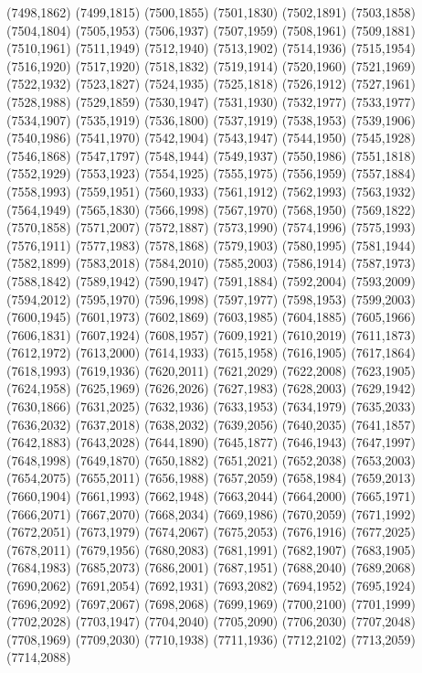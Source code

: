(7498,1862)
(7499,1815)
(7500,1855)
(7501,1830)
(7502,1891)
(7503,1858)
(7504,1804)
(7505,1953)
(7506,1937)
(7507,1959)
(7508,1961)
(7509,1881)
(7510,1961)
(7511,1949)
(7512,1940)
(7513,1902)
(7514,1936)
(7515,1954)
(7516,1920)
(7517,1920)
(7518,1832)
(7519,1914)
(7520,1960)
(7521,1969)
(7522,1932)
(7523,1827)
(7524,1935)
(7525,1818)
(7526,1912)
(7527,1961)
(7528,1988)
(7529,1859)
(7530,1947)
(7531,1930)
(7532,1977)
(7533,1977)
(7534,1907)
(7535,1919)
(7536,1800)
(7537,1919)
(7538,1953)
(7539,1906)
(7540,1986)
(7541,1970)
(7542,1904)
(7543,1947)
(7544,1950)
(7545,1928)
(7546,1868)
(7547,1797)
(7548,1944)
(7549,1937)
(7550,1986)
(7551,1818)
(7552,1929)
(7553,1923)
(7554,1925)
(7555,1975)
(7556,1959)
(7557,1884)
(7558,1993)
(7559,1951)
(7560,1933)
(7561,1912)
(7562,1993)
(7563,1932)
(7564,1949)
(7565,1830)
(7566,1998)
(7567,1970)
(7568,1950)
(7569,1822)
(7570,1858)
(7571,2007)
(7572,1887)
(7573,1990)
(7574,1996)
(7575,1993)
(7576,1911)
(7577,1983)
(7578,1868)
(7579,1903)
(7580,1995)
(7581,1944)
(7582,1899)
(7583,2018)
(7584,2010)
(7585,2003)
(7586,1914)
(7587,1973)
(7588,1842)
(7589,1942)
(7590,1947)
(7591,1884)
(7592,2004)
(7593,2009)
(7594,2012)
(7595,1970)
(7596,1998)
(7597,1977)
(7598,1953)
(7599,2003)
(7600,1945)
(7601,1973)
(7602,1869)
(7603,1985)
(7604,1885)
(7605,1966)
(7606,1831)
(7607,1924)
(7608,1957)
(7609,1921)
(7610,2019)
(7611,1873)
(7612,1972)
(7613,2000)
(7614,1933)
(7615,1958)
(7616,1905)
(7617,1864)
(7618,1993)
(7619,1936)
(7620,2011)
(7621,2029)
(7622,2008)
(7623,1905)
(7624,1958)
(7625,1969)
(7626,2026)
(7627,1983)
(7628,2003)
(7629,1942)
(7630,1866)
(7631,2025)
(7632,1936)
(7633,1953)
(7634,1979)
(7635,2033)
(7636,2032)
(7637,2018)
(7638,2032)
(7639,2056)
(7640,2035)
(7641,1857)
(7642,1883)
(7643,2028)
(7644,1890)
(7645,1877)
(7646,1943)
(7647,1997)
(7648,1998)
(7649,1870)
(7650,1882)
(7651,2021)
(7652,2038)
(7653,2003)
(7654,2075)
(7655,2011)
(7656,1988)
(7657,2059)
(7658,1984)
(7659,2013)
(7660,1904)
(7661,1993)
(7662,1948)
(7663,2044)
(7664,2000)
(7665,1971)
(7666,2071)
(7667,2070)
(7668,2034)
(7669,1986)
(7670,2059)
(7671,1992)
(7672,2051)
(7673,1979)
(7674,2067)
(7675,2053)
(7676,1916)
(7677,2025)
(7678,2011)
(7679,1956)
(7680,2083)
(7681,1991)
(7682,1907)
(7683,1905)
(7684,1983)
(7685,2073)
(7686,2001)
(7687,1951)
(7688,2040)
(7689,2068)
(7690,2062)
(7691,2054)
(7692,1931)
(7693,2082)
(7694,1952)
(7695,1924)
(7696,2092)
(7697,2067)
(7698,2068)
(7699,1969)
(7700,2100)
(7701,1999)
(7702,2028)
(7703,1947)
(7704,2040)
(7705,2090)
(7706,2030)
(7707,2048)
(7708,1969)
(7709,2030)
(7710,1938)
(7711,1936)
(7712,2102)
(7713,2059)
(7714,2088)
